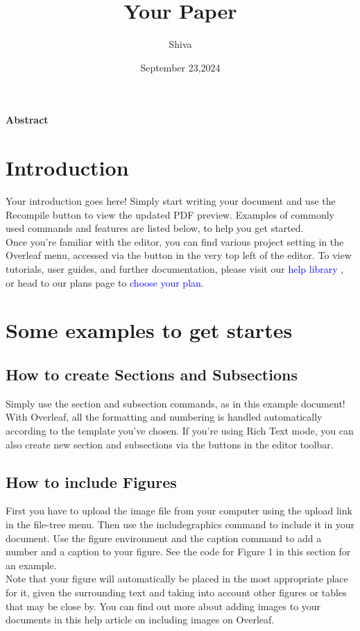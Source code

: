 \documentclass{article}
\title{Your Paper}
\author{Shiva}
\date{September 23,2024}
\begin{document}
		\maketitle
		\center \textbf {Abstract\\}
		 
		 
		 
		\section{Introduction}
		
		
		 \item	Your introduction goes here! Simply start writing your document and use the Recompile button to
		 	view the updated PDF preview. Examples of commonly used commands and features are listed below,
		 	to help you get started.\\
		 \hspace{1cm} Once you’re familiar with the editor, you can find various project setting in the Overleaf menu,
		 	accessed via the button in the very top left of the editor. To view tutorials, user guides, and further
		 	documentation, please visit our \textcolor{blue}{ help library }, or head to our plans page to \textcolor{blue}{ choose your plan.}
		 
	 
	 \section{Some examples to get startes}
	 \subsection{How to create Sections and Subsections}
	 
	 
	 	 Simply use the section and subsection commands, as in this example document! With Overleaf, all
	 	the formatting and numbering is handled automatically according to the template you’ve chosen. If
	 	you’re using Rich Text mode, you can also create new section and subsections via the buttons in the
	 	editor toolbar.
	 
	
	\subsection{How to include Figures}
	First you have to upload the image file from your computer using the upload link in the file-tree menu.
	Then use the includegraphics command to include it in your document. Use the figure environment
	and the caption command to add a number and a caption to your figure. See the code for Figure 1 in
	this section for an example.\\
	\hspace{1cm}Note that your figure will automatically be placed in the most appropriate place for it, given the
	surrounding text and taking into account other figures or tables that may be close by. You can find
	out more about adding images to your documents in this help article on including images on Overleaf.
	
\end{document}
